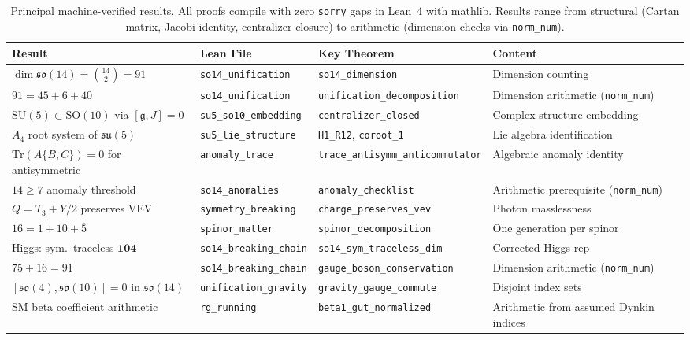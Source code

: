 \documentclass[aps,prd,twocolumn,showpacs,preprintnumbers,superscriptaddress,floatfix]{revtex4-2}
\newcommand{\so}{\mathfrak{so}}
\newcommand{\su}{\mathfrak{su}}
\newcommand{\Tr}{\mathrm{Tr}}
\begin{document}
\begin{table}[t]
\centering
\caption{Principal machine-verified results.  All proofs compile with
  zero \texttt{sorry} gaps in Lean~4 with mathlib.  Results range from structural (Cartan matrix, Jacobi identity, centralizer closure) to arithmetic (dimension checks via \texttt{norm\_num}).}
\label{tab:mv}
\small
\begin{tabular}{@{}llll@{}}
\toprule
\textbf{Result} & \textbf{Lean File} & \textbf{Key Theorem} & \textbf{Content} \\
\midrule
$\dim \so(14) = \binom{14}{2} = 91$ %
  & \texttt{so14\_unification} & \texttt{so14\_dimension} & Dimension counting \\
$91 = 45 + 6 + 40$ %
  & \texttt{so14\_unification} & \texttt{unification\_decomposition} & Dimension arithmetic (\texttt{norm\_num}) \\
$\mathrm{SU}(5) \subset \mathrm{SO}(10)$ via $[\mathfrak{g}, J] = 0$ %
  & \texttt{su5\_so10\_embedding} & \texttt{centralizer\_closed} & Complex structure embedding \\
$A_4$ root system of $\su(5)$ %
  & \texttt{su5\_lie\_structure} & \texttt{H1\_R12}, \texttt{coroot\_1} & Lie algebra identification \\
$\Tr(A\{B,C\}) = 0$ for antisymmetric %
  & \texttt{anomaly\_trace} & \texttt{trace\_antisymm\_anticommutator} & Algebraic anomaly identity \\
$14 \geq 7$ anomaly threshold %
  & \texttt{so14\_anomalies} & \texttt{anomaly\_checklist} & Arithmetic prerequisite (\texttt{norm\_num}) \\
$Q = T_3 + Y/2$ preserves VEV %
  & \texttt{symmetry\_breaking} & \texttt{charge\_preserves\_vev} & Photon masslessness \\
$16 = 1 + 10 + \overline{5}$ %
  & \texttt{spinor\_matter} & \texttt{spinor\_decomposition} & One generation per spinor \\
Higgs: sym.\ traceless $\mathbf{104}$ %
  & \texttt{so14\_breaking\_chain} & \texttt{so14\_sym\_traceless\_dim} & Corrected Higgs rep \\
$75 + 16 = 91$ %
  & \texttt{so14\_breaking\_chain} & \texttt{gauge\_boson\_conservation} & Dimension arithmetic (\texttt{norm\_num}) \\
$[\so(4), \so(10)] = 0$ in $\so(14)$ %
  & \texttt{unification\_gravity} & \texttt{gravity\_gauge\_commute} & Disjoint index sets \\
SM beta coefficient arithmetic %
  & \texttt{rg\_running} & \texttt{beta1\_gut\_normalized} & Arithmetic from assumed Dynkin indices \\

\end{tabular}
\end{table}
\end{document}
